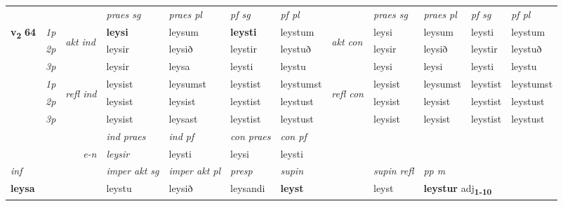 \begin{longtable}[l]{X>{\footnotesize\itshape}llXXXXlXXXX}
\midrule

 & &   & \textit{praes sg}  & \textit{praes pl}    & \textit{ pf sg} & \textit{pf pl} & & \textit{praes sg}  & \textit{praes pl}    & \textit{pf sg} & \textit{pf pl }  \\ \cmidrule{4-7} \cmidrule{9-12}
 \multirow{2}{*}{{{\textbf{v{\textsubscript{2}}} \Large{\textbf{64}}}}}  & 1p & \multirow{3}{*}{\begin{turn}{90}\textit{akt ind}\end{turn}} & \textbf{leysi} & leysum & \textbf{leysti} & leystum & \multirow{3}{*}{\begin{turn}{90}\textit{akt con}\end{turn}} &leysi & leysum & leysti & leystum\\*
 & 2p &  &  leysir  & leysið & leystir & leystuð & & leysir & leysið & leystir & leystuð \\*
 & 3p &  & leysir & leysa & leysti & leystu & & leysi & leysi& leysti & leystu \\*
\cmidrule{4-7} \cmidrule{9-12}
 & 1p & \multirow{3}{*}{\begin{turn}{90}\textit{refl ind}\end{turn}}  & leysist & leysumst & leystist & leystumst & \multirow{3}{*}{\begin{turn}{90}\textit{refl con}\end{turn}}  &leysist & leysumst & leystist & leystumst \\*
 & 2p &  & leysist & leysist & leystist & leystust & &leysist & leysist & leystist & leystust \\*
 & 3p  & & leysist & leysast & leystist & leystust & & leysist & leysist& leystist & leystust \\*
\cmidrule{4-7} \cmidrule{9-12}

   && &  \textit{ind praes} & \textit{ind pf} & \textit{con praes} & \textit{con pf} \\*
\multicolumn{3}{r}{\textit{e-n}} & leysir & leysti & leysi & leysti \\*

\cmidrule{4-7}
   {\textit{inf}} & &  & \textit{imper akt sg} & \textit{imper akt pl}   & \textit{presp} & \textit{supin} && \textit{supin refl} & \textit{pp m} \\*
  {\textbf{leysa}} & && leystu  & leysið   & leysandi &  \textbf{leyst} && leyst & \multicolumn{2}{l}{\textbf{leystur} adj\textbf{\textsubscript{1-10}}} \\*

\midrule


\end{longtable}
